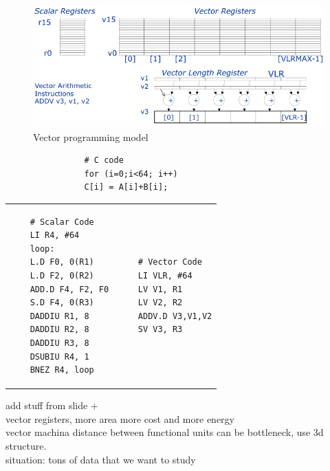 \begin{figure}[h]
    \centering
    \includegraphics[scale = 0.35]{images/vector-programming-model}
    \caption{Vector programming model}
    \label{fig:vector-programming-model}
\end{figure}

\begin{table}[h]
    \begin{verbatim}
                # C code
                for (i=0;i<64; i++)
                C[i] = A[i]+B[i];
    \end{verbatim}
    \begin{tabular}{p{1.6in}|p{1.4in}}
        \begin{verbatim}
    # Scalar Code
    LI R4, #64
    loop:
    L.D F0, 0(R1)
    L.D F2, 0(R2)
    ADD.D F4, F2, F0
    S.D F4, 0(R3)
    DADDIU R1, 8
    DADDIU R2, 8
    DADDIU R3, 8
    DSUBIU R4, 1
    BNEZ R4, loop
        \end{verbatim} &
        \begin{verbatim}
    # Vector Code
    LI VLR, #64
    LV V1, R1
    LV V2, R2
    ADDV.D V3,V1,V2
    SV V3, R3
        \end{verbatim}
    \end{tabular}
    \label{tab:vector-programming-comparison}
\end{table}

add stuff from slide +\\
vector registers, more area more cost and more energy\\
vector machina distance between functional units can be bottleneck, use 3d structure.\\
situation: tons of data that we want to study\\

